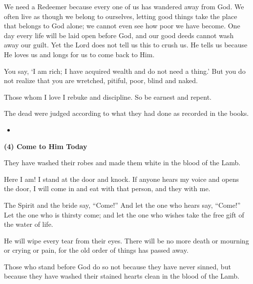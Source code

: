 \begin{center}
\begin{tcolorbox}
\hspace{0.5cm} We need a Redeemer because every one of us has wandered away from God. We often live as though we belong to ourselves, letting good things take the place that belongs to God alone; we cannot even see how poor we have become. One day every life will be laid open before God, and our good deeds cannot wash away our guilt. Yet the Lord does not tell us this to crush us. He tells us because He loves us and longs for us to come back to Him.
\begin{ScriptureBox}
\item[3:17] You say, `I am rich; I have acquired wealth and do not need a thing.' But you do not realize that you are wretched, pitiful, poor, blind and naked.
\item[3:19] Those whom I love I rebuke and discipline. So be earnest and repent.
\item[20:12] The dead were judged according to what they had done as recorded in the books.
\end{ScriptureBox}

\begin{itemize}[leftmargin=2em, labelsep=0.3em]
\item[Q.] 
\end{itemize}

\vspace{0.15cm}
\textbf{(4) Come to Him Today}

\begin{ScriptureBox}
\item[7:14] They have washed their robes and made them white in the blood of the Lamb.
\item[3:20] Here I am! I stand at the door and knock. If anyone hears my voice and opens the door, I will come in and eat with that person, and they with me.
\item[22:17] The Spirit and the bride say, ``Come!'' And let the one who hears say, ``Come!'' Let the one who is thirsty come; and let the one who wishes take the free gift of the water of life.
\item[21:4] He will wipe every tear from their eyes. There will be no more death or mourning or crying or pain, for the old order of things has passed away.
\end{ScriptureBox}

\hspace{0.5cm} Those who stand before God do so not because they have never sinned, but because they have washed their stained hearts clean in the blood of the Lamb.


\end{tcolorbox}
\end{center}
